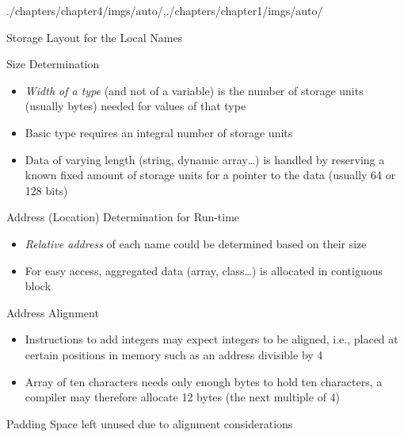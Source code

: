 \begin{graphicspathcontext}{{./chapters/chapter4/imgs/auto/},{./chapters/chapter1/imgs/auto/}}
\begin{bibunit}[apalike]
\begin{frame}{{Storage Layout} for the Local Names}
	\begin{footnotesize}
		\begin{block}{Size Determination}
			\begin{itemize}
				\item \emph{Width of a type} (and not of a variable) is the number of storage units (usually bytes) needed for values of that type
				\item Basic type requires an integral number of storage units
				\item Data of varying length (string, dynamic array\dots) is handled by reserving a known fixed amount of storage units for a pointer to the data (usually 64 or 128 bits)
			\end{itemize}
		\end{block}
		\begin{block}{Address (Location) Determination for Run-time}
			\begin{itemize}
				\item \emph{Relative address} of each name could be determined based on their size
				\item For easy access, aggregated data (array, class\dots) is allocated in contiguous block
			\end{itemize}
		\end{block}
	\end{footnotesize}
\end{frame}

\begin{frame}[t]{Address Alignment}
	\begin{small}
		\begin{examples}
			\begin{itemize}
			\item Instructions to add integers may expect integers to be aligned, i.e., placed at certain positions in memory such as an address divisible by 4
			\item Array of ten characters needs only enough bytes to hold ten characters, a compiler may therefore allocate 12 bytes (the next multiple of 4)
			\end{itemize}
		\end{examples}
		\begin{definitionblock}{Padding}
			Space left unused due to alignment considerations
		\end{definitionblock}
	\end{small}
\end{frame}


\end{bibunit}
\end{graphicspathcontext}
